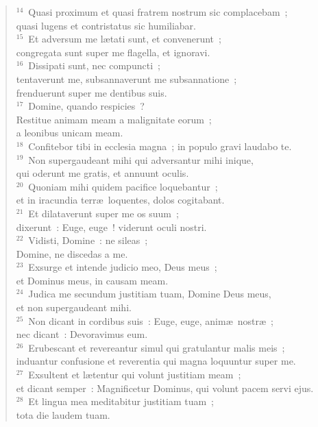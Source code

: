 \begin{flushleft}
\begin{verse}
${}^{14}$~Quasi proximum et quasi fratrem nostrum sic complacebam~;\\ quasi lugens et contristatus sic humiliabar.\\
${}^{15}$~Et adversum me l\ae tati sunt, et convenerunt~;\\ congregata sunt super me flagella, et ignoravi.\\
${}^{16}$~Dissipati sunt, nec compuncti~;\\ tentaverunt me, subsannaverunt me subsannatione~;\\ frenduerunt super me dentibus suis.\\
${}^{17}$~Domine, quando respicies~?\\ Restitue animam meam a malignitate eorum~;\\ a leonibus unicam meam.\\
${}^{18}$~Confitebor tibi in ecclesia magna~; in populo gravi laudabo te.\\
${}^{19}$~Non supergaudeant mihi qui adversantur mihi inique,\\ qui oderunt me gratis, et annuunt oculis.\\
${}^{20}$~Quoniam mihi quidem pacifice loquebantur~;\\ et in iracundia terr\ae\ loquentes, dolos cogitabant.\\
${}^{21}$~Et dilataverunt super me os suum~;\\ dixerunt~: Euge, euge~! viderunt oculi nostri.\\
${}^{22}$~Vidisti, Domine~: ne sileas~;\\ Domine, ne discedas a me.\\
${}^{23}$~Exsurge et intende judicio meo, Deus meus~;\\ et Dominus meus, in causam meam.\\
${}^{24}$~Judica me secundum justitiam tuam, Domine Deus meus,\\ et non supergaudeant mihi.\\
${}^{25}$~Non dicant in cordibus suis~: Euge, euge, anim\ae\ nostr\ae~;\\ nec dicant~: Devoravimus eum.\\
${}^{26}$~Erubescant et revereantur simul qui gratulantur malis meis~;\\ induantur confusione et reverentia qui magna loquuntur super me.\\
${}^{27}$~Exsultent et l\ae tentur qui volunt justitiam meam~;\\ et dicant semper~: Magnificetur Dominus, qui volunt pacem servi ejus.\\
${}^{28}$~Et lingua mea meditabitur justitiam tuam~;\\ tota die laudem tuam.\end{verse}\end{flushleft}



